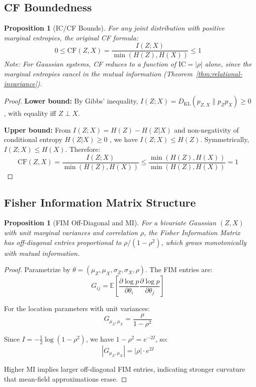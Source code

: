 \documentclass[10pt]{article} %
\theoremstyle{plain}
\newtheorem{proposition}[theorem]{Proposition}
\theoremstyle{definition}
\newcommand{\IC}{\mathrm{IC}}  %
\newcommand{\MI}{I}
\newcommand{\Ent}{H}
\newcommand{\KL}{D_{\mathrm{KL}}}
\newcommand{\E}{\mathbb{E}}
\begin{document}
\subsection{CF Boundedness}

\begin{proposition}[IC/CF Bounds]
\label{prop:cf-bounds}
For any joint distribution with positive marginal entropies, the original CF formula:
\[
0 \leq \text{CF}(Z, X) = \frac{I(Z;X)}{\min(H(Z), H(X))} \leq 1
\]
Note: For Gaussian systems, CF reduces to a function of $\IC = |\rho|$ alone, since the marginal entropies cancel in the mutual information (Theorem~\ref{thm:relational-invariance}).
\end{proposition}

\begin{proof}
\textbf{Lower bound:} By Gibbs' inequality, $\MI(Z; X) = \KL(p_{Z,X} \| p_Z p_X) \geq 0$, with equality iff $Z \perp X$.

\textbf{Upper bound:} From $\MI(Z; X) = \Ent(Z) - \Ent(Z|X)$ and non-negativity of conditional entropy $\Ent(Z|X) \geq 0$ \citep{cover2006elements}, we have $\MI(Z;X) \leq \Ent(Z)$. Symmetrically, $\MI(Z;X) \leq \Ent(X)$. Therefore:
\[
\text{CF}(Z, X) = \frac{\MI(Z;X)}{\min(\Ent(Z), \Ent(X))} \leq \frac{\min(\Ent(Z), \Ent(X))}{\min(\Ent(Z), \Ent(X))} = 1
\]
\end{proof}

\subsection{Fisher Information Matrix Structure}

\begin{proposition}[FIM Off-Diagonal and MI]
\label{prop:fim-mi}
For a bivariate Gaussian $(Z, X)$ with unit marginal variances and correlation $\rho$, the Fisher Information Matrix has off-diagonal entries proportional to $\rho/(1-\rho^2)$, which grows monotonically with mutual information.
\end{proposition}

\begin{proof}
Parametrize by $\theta = (\mu_Z, \mu_X, \sigma_Z, \sigma_X, \rho)$. The FIM entries are:
\[
G_{ij} = \E\left[\frac{\partial \log p}{\partial \theta_i} \frac{\partial \log p}{\partial \theta_j}\right]
\]

For the location parameters with unit variances:
\[
G_{\mu_Z, \mu_X} = \frac{\rho}{1 - \rho^2}
\]

Since $\MI = -\frac{1}{2}\log(1-\rho^2)$, we have $1-\rho^2 = e^{-2\MI}$, so:
\[
|G_{\mu_Z, \mu_X}| = |\rho| \cdot e^{2\MI}
\]

Higher MI implies larger off-diagonal FIM entries, indicating stronger curvature that mean-field approximations erase.
\end{proof}
\end{document}
